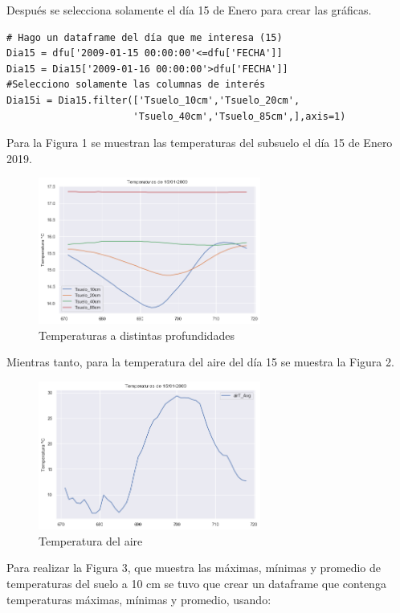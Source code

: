 \documentclass[11pt, spanish]{report}
\begin{document}
Después se selecciona solamente el día 15 de Enero para crear las gráficas.
\begin{verbatim}
# Hago un dataframe del día que me interesa (15)
Dia15 = dfu['2009-01-15 00:00:00'<=dfu['FECHA']]
Dia15 = Dia15['2009-01-16 00:00:00'>dfu['FECHA']]
#Selecciono solamente las columnas de interés
Dia15i = Dia15.filter(['Tsuelo_10cm','Tsuelo_20cm',
                      'Tsuelo_40cm','Tsuelo_85cm',],axis=1)
\end{verbatim}
Para la Figura 1 se muestran las temperaturas del subsuelo el día 15 de Enero 2019.
\begin{figure}[ht]
\caption{Temperaturas a distintas profundidades}
\centering
\includegraphics[width=0.65\textwidth]{figura1.png}
\end{figure}
Mientras tanto, para la temperatura del aire del día 15 se muestra la Figura 2.
\begin{figure}[ht]
\caption{Temperatura del aire}
\centering
\includegraphics[width=0.65\textwidth]{figura2.png}
\end{figure}
Para realizar la Figura 3, que muestra las máximas, mínimas y promedio de temperaturas del suelo a 10 cm se tuvo que crear un dataframe que contenga temperaturas máximas, mínimas y promedio, usando:
\end{document}
